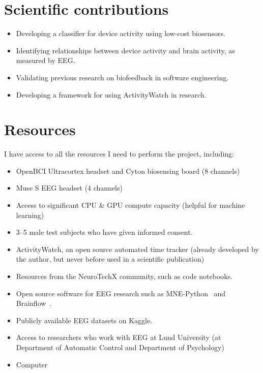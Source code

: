 \documentclass{IEEEtran}
\begin{document}
\begin{refsection}

\section{Scientific contributions}

\begin{itemize}
  \item Developing a classifier for device activity using low-cost biosensors.
  \item Identifying relationships between device activity and brain activity, as measured by EEG\@.
  \item Validating previous research on biofeedback in software engineering.
  \item Developing a framework for using ActivityWatch in research.
\end{itemize}


\section{Resources}

I have access to all the resources I need to perform the project, including:

\begin{itemize}
  \item OpenBCI Ultracortex headset and Cyton biosensing board (8 channels)
  \item Muse S EEG headset (4 channels)
  \item Access to significant CPU \& GPU compute capacity (helpful for machine learning)
  \item 3--5 male test subjects who have given informed consent.
  \item ActivityWatch, an open source automated time tracker (already developed by the author, but never before used in a scientific publication)
  \item Resources from the NeuroTechX community, such as code notebooks.\cite{noauthor_neurotechxeeg-notebooks_2020}
  \item Open source software for EEG research such as MNE-Python~\cite{noauthor_mne-toolsmne-python_2020} and Brainflow~\cite{noauthor_brainflow-devbrainflow_2020}.
  \item Publicly available EEG datasets on Kaggle.\cite{noauthor_search_nodate}
  \item Access to researchers who work with EEG at Lund University (at Department of Automatic Control and Department of Psychology)
  \item Computer
\end{itemize}


\end{refsection}
\end{document}
